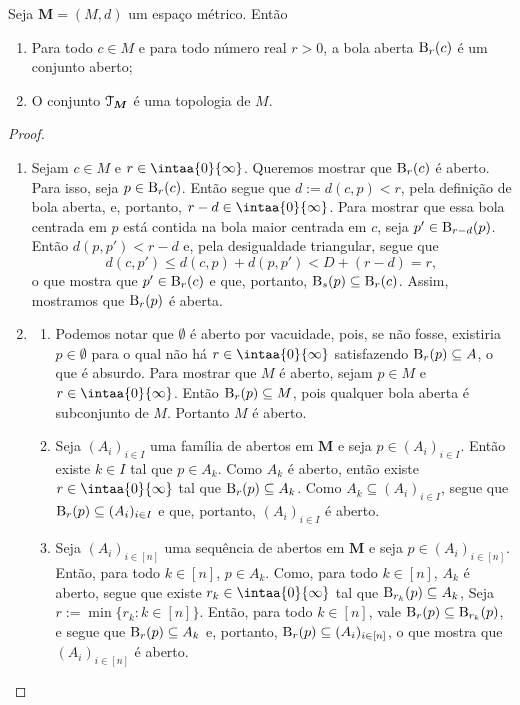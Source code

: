 \begin{prop}
Seja $\bm M = (M,d)$ um espaço métrico. Então
	\begin{enumerate}
	\item Para todo $c \in M$ e para todo número real $r > 0$, a bola aberta $\mathrm{B}_r(c)$ é um conjunto aberto;
	\item O conjunto $\mathcal{T}_{\bm M}$ é uma topologia de $M$.
	\end{enumerate}
\end{prop}
\begin{proof}
	\begin{enumerate}
	\item Sejam $c \in M$ e $r \in \intaa{0}{\infty}$. Queremos mostrar que $\mathrm{B}_r(c)$ é aberto. Para isso, seja $p \in \mathrm{B}_r(c)$. Então segue que $d := d(c,p) < r$, pela definição de bola aberta, e, portanto, $r-d \in \intaa{0}{\infty}$. Para mostrar que essa bola centrada em $p$ está contida na bola maior centrada em $c$, seja $p' \in \mathrm{B}_{r-d}(p)$. Então $d(p,p')<r-d$ e, pela desigualdade triangular, segue que
	\begin{equation*}
	d(c,p') \leq d(c,p) + d(p,p') < D + (r-d) = r,
	\end{equation*}
o que mostra que $p' \in \mathrm{B}_r(c)$ e que, portanto, $\mathrm{B}_s(p) \subseteq \mathrm{B}_r(c)$. Assim, mostramos que $\mathrm{B}_r(p)$ é aberta.
	
	\item
		\begin{enumerate}
		\item Podemos notar que $\emptyset$ é aberto por vacuidade, pois, se não fosse, existiria $p \in \emptyset$ para o qual não há $r \in \intaa{0}{\infty}$ satisfazendo $\mathrm{B}_r(p) \subseteq A$, o que é absurdo.
	Para mostrar que $M$ é aberto, sejam $p \in M$ e $r \in \intaa{0}{\infty}$. Então $\mathrm{B}_r(p) \subseteq M$, pois qualquer bola aberta é subconjunto de $M$. Portanto $M$ é aberto.
	
		\item Seja $(A_i)_{i \in I}$ uma família de abertos em $\bm M$ e seja $p \in (A_i)_{i \in I}$. Então existe $k \in I$ tal que $p \in A_k$. Como $A_k$ é aberto, então existe $r \in \intaa{0}{\infty}$ tal que $\mathrm{B}_r(p) \subseteq A_k$. Como $A_k \subseteq (A_i)_{i \in I}$, segue que $\mathrm{B}_r(p) \subseteq (A_i)_{i \in I}$ e que, portanto, $(A_i)_{i \in I}$ é aberto.
	
		\item Seja $(A_i)_{i \in [n]}$ uma sequência de abertos em $\bm M$ e seja $p \in (A_i)_{i \in [n]}$. Então, para todo $k \in [n]$, $p \in A_k$. Como, para todo $k \in [n]$, $A_k$ é aberto, segue que existe $r_k \in \intaa{0}{\infty}$ tal que $\mathrm{B}_{r_k}(p) \subseteq A_k$, Seja $r := \min \{r_k : k \in [n]\}$. Então, para todo $k \in [n]$, vale $\mathrm{B}_r(p) \subseteq \mathrm{B}_{r_k}(p)$, e segue que $\mathrm{B}_r(p) \subseteq A_k$ e, portanto, $\mathrm{B}_r(p) \subseteq (A_i)_{i \in [n]}$, o que mostra que $(A_i)_{i \in [n]}$ é aberto.
		\end{enumerate}		
	\end{enumerate}
\end{proof}


